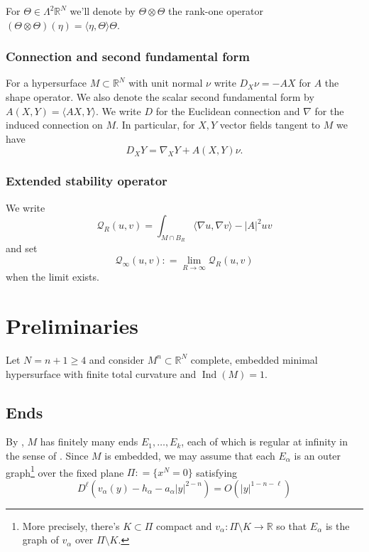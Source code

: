 \documentclass[11pt]{amsart}
\numberwithin{equation}{section}
\theoremstyle{plain}
\theoremstyle{definition}
\theoremstyle{remark}
\newcommand{\R}{\mathbb{R}}
\DeclareMathOperator{\Ind}{Ind}
\newcommand{\Qcal}{\mathcal Q}
\newcommand{\bangle}[1]{\langle #1 \rangle}
\begin{document}
For $\Theta \in \Lambda^2\R^N$ we'll denote by $\Theta\otimes\Theta$ the rank-one operator $(\Theta\otimes \Theta)(\eta) = \bangle{\eta,\Theta}\Theta$. 




\subsubsection{Connection and second fundamental form }For a hypersurface $M \subset \R^N$ with unit normal $\nu$ write $D_X \nu = - A X$ for $A$ the shape operator. We also denote the scalar second fundamental form by $A(X,Y) = \bangle{AX,Y}$. We write $D$ for the Euclidean connection and $\nabla$ for the induced connection on $M$. In particular, for $X,Y$ vector fields tangent to $M$ we have
\begin{equation}\label{eq:D-nabla}
D_X Y = \nabla_X Y + A(X,Y) \nu .
\end{equation}


\subsubsection{Extended stability operator} We write
\[
\Qcal_R(u,v) = \int_{M\cap B_R} \bangle{\nabla u,\nabla v} - |A|^2 uv 
\]
and set 
\begin{equation}\label{eq:Qcal-infty}
\Qcal_\infty(u,v) : = \lim_{R\to\infty} \Qcal_R(u,v)
\end{equation}
 when the limit exists. 

\section{Preliminaries} \label{sec:prelim}

Let $N = n+1\geq 4$ and consider $M^n\subset \R^N$ complete, embedded minimal hypersurface with finite total curvature and $\Ind(M) = 1$. 



\subsection{Ends} By , $M$ has finitely many ends $E_1,\dots,E_k$, each of which is regular at infinity in the sense of . Since $M$ is embedded, we may assume that each $E_\alpha$ is an outer graph\footnote{More precisely, there's $K\subset \Pi$ compact and $v_\alpha : \Pi \setminus K \to \R$ so that $E_\alpha$ is the graph of $v_\alpha$ over $\Pi\setminus K$. } over the fixed plane $\Pi : = \{x^N = 0\}$ satisfying
\[
D^\ell \left( v_\alpha(y) -  h_\alpha - a_\alpha |y|^{2-n} \right) =  O(|y|^{1-n-\ell})
\]
\end{document}
